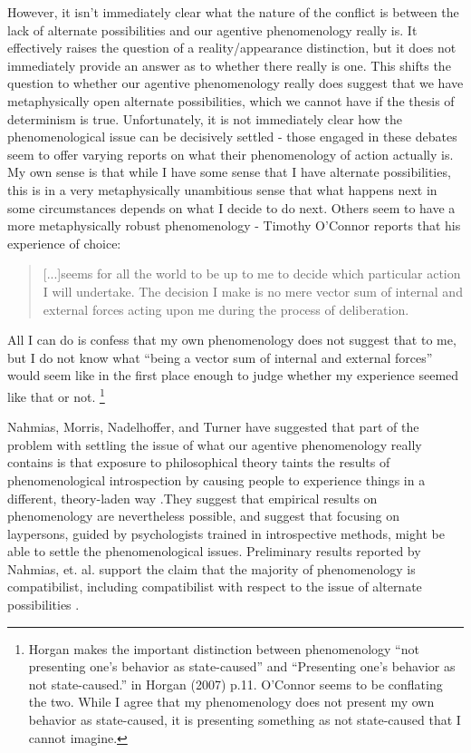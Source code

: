 \documentclass[phd,12pt,oneside,paper=letterpaper]{ubcthesis}
\begin{document}
However, it isn't immediately clear what the nature of the conflict is between the lack of alternate possibilities and our agentive phenomenology really is. It effectively raises the question of a reality/appearance distinction, but it does not immediately provide an answer as to whether there really is one. This shifts the question to whether our agentive phenomenology really does suggest that we have metaphysically open alternate possibilities, which we cannot have if the thesis of determinism is true. Unfortunately, it is not immediately clear how the phenomenological issue can be decisively settled - those engaged in these debates seem to offer varying reports on what their phenomenology of action actually is. My own sense is that while I have some sense that I have alternate possibilities, this is in a very metaphysically unambitious sense that what happens next in some circumstances depends on what I decide to do next. Others seem to have a more metaphysically robust phenomenology - Timothy O'Connor reports that his experience of choice: 

\begin{quote}
[...]seems for all the world to be up to me to decide which particular action I will undertake. The decision I make is no mere vector sum of internal and external forces acting upon me during the process of deliberation. \citep[p.173]{oconnor1995}
\end{quote}

All I can do is confess that my own phenomenology does not suggest that to me, but I do not know what ``being a vector sum of internal and external forces'' would seem like in the first place enough to judge whether my experience seemed like that or not. \footnote{Horgan makes the important distinction between phenomenology ``not presenting one's behavior as state-caused'' and ``Presenting one's behavior as not state-caused.'' in Horgan (2007) p.11. O'Connor seems to be conflating the two. While I agree that my phenomenology does not present my own behavior as state-caused, it is presenting something as not state-caused that I cannot imagine.}

Nahmias, Morris, Nadelhoffer, and Turner have suggested that part of the problem with settling the issue of what our agentive phenomenology really contains is that exposure to philosophical theory taints the results of phenomenological introspection by causing people to experience things in a different, theory-laden way \citep[p.172]{nahmias2004}.They suggest that empirical results on phenomenology are nevertheless possible, and suggest that focusing on laypersons, guided by psychologists trained in introspective methods, might be able to settle the phenomenological issues. Preliminary results reported by Nahmias, et. al. support the claim that the majority of phenomenology is compatibilist, including compatibilist with respect to the issue of alternate possibilities \citep[p.174]{nahmias2004}.
\end{document}
